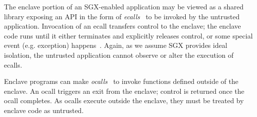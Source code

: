 The enclave portion of an SGX-enabled application may be viewed as a shared
library exposing an API in the form of \emph{ecalls}~\cite{sgxsdk} to be invoked by the
untrusted application. Invocation of an ecall transfers control to the enclave;
the enclave code runs until it either terminates and explicitly releases
control, or some special event (e.g. exception) happens~\cite{sgxmanual}.
Again, as we assume SGX provides ideal isolation, the untrusted application
cannot observe or alter the execution of ecalls.

Enclave programs can make \emph{ocalls}~\cite{sgxsdk} to invoke functions defined outside of
the enclave. An ocall triggers an exit from the enclave; control is returned
once the ocall completes. As ocalls execute outside the enclave, they must be
treated by enclave code as untrusted. 


